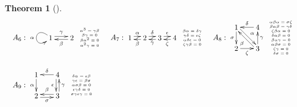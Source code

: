 \documentclass[12pt]{amsart}
\newtheorem{thm}{Theorem}[section]
\numberwithin{equation}{thm}
\begin{document}
{\begin{thm}[{\cite[Theorem, Theorem]{S}}]
\[\begin{array}{c}
\begin{array}{lll}
A_6:
\begin{xy}
(0,0) *[o]+{1}="A", (10,0) *[o]+{2}="B",
\ar @(lu,ld) "A";"A"_{\alpha}
\ar @<2pt> "A";"B"^{\gamma}
\ar @<2pt> "B";"A"^{\beta}
\end{xy}
\tiny{ \begin{array}{c}
  \alpha^3=\gamma\beta \\
 \beta\gamma=0 \\
 \beta\alpha^2=0 \\
 \alpha^2\gamma=0 \\
\end{array}
}
 &
A_7:
\begin{xy}
(0,0) *[o]+{1}="A", (7,0) *[o]+{2}="B", (14,0) *[o]+{3}="C", (21,0) *[o]+{4}="D",
\ar @<2pt> "A";"B"^{\alpha}
\ar @<2pt> "B";"A"^{\beta}
\ar @<2pt> "B";"C"^{\delta}
\ar @<2pt> "C";"B"^{\gamma}
\ar @<2pt> "C";"D"^{\epsilon}
\ar @<2pt> "D";"C"^{\zeta}
\end{xy}
{\tiny \begin{array}{c}
  \beta\alpha=\delta\gamma \\
 \gamma\delta=\epsilon\zeta \\
 \alpha\delta\epsilon=0 \\
 \zeta\gamma\beta=0 \\
\end{array}
}
&
A_8:
\begin{xy}
(0,5) *[o]+{1}="A", (0,-5) *[o]+{2}="B", (10,-5) *[o]+{3}="C", (10,5) *[o]+{4}="D",
\ar "A";"B"_{\sigma}
\ar "B";"C"_{\zeta}
\ar "C";"D"_{\gamma}
\ar "D";"A"_{\delta}
\ar @<2pt> "A";"C"^{\alpha}
\ar @<2pt> "C";"A"^{\beta}
\end{xy}
{\tiny \begin{array}{c}
  \alpha\beta\alpha=\sigma\zeta \\
  \beta\alpha\beta=\gamma\delta\\
  \zeta\beta\alpha=0 \\
 \delta\alpha\beta=0 \\
 \beta\alpha\gamma=0 \\
 \alpha\beta\sigma=0 \\
 \zeta\gamma=0 \\
 \delta\sigma=0\\
\end{array}
}\\\\

A_9:
\begin{xy}
(0,5) *[o]+{1}="A", (0,-5) *[o]+{2}="B", (10,-5) *[o]+{3}="C", (10,5) *[o]+{4}="D",
\ar "A";"B"_{\alpha}
\ar @<-2pt>"B";"C"_{\sigma}
\ar @<-2pt>"C";"B"_{\beta}
\ar @<-2pt> "C";"D"_{\gamma}
\ar @<-2pt> "D";"C"_{\epsilon}
\ar "D";"A"_{\delta}
\end{xy}
{\tiny \begin{array}{c}
  \delta\alpha=\epsilon\beta \\
  \gamma\epsilon=\beta\sigma\\
 \alpha\sigma\beta=0 \\
 \epsilon\gamma\delta=0 \\
 \sigma\gamma\epsilon\gamma=0 \\
 

\end{array}}
\end{array}
\end{array}\]
\end{thm}}
\end{document}
